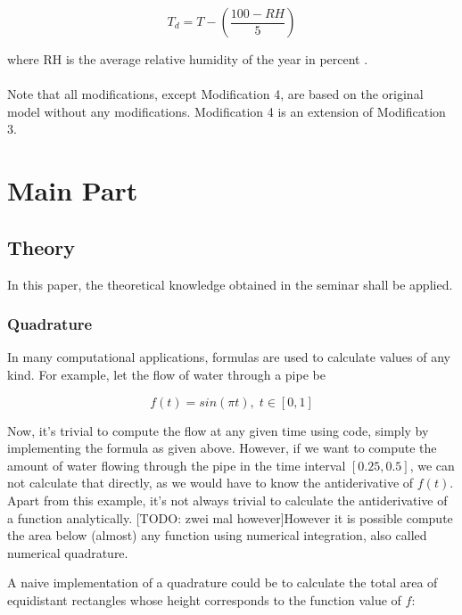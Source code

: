 \documentclass[12pt, a4paper, oneside]{article}
\begin{document}
\begin{equation}
	{T_d} = T - (\frac{100 - RH}{5})
\end{equation}

where RH is the average relative humidity of the year in percent \citep{lawrence2005relationship}.\\\\


Note that all modifications, except Modification 4, are based on the original model without any modifications.
Modification 4 is an extension of Modification 3. 

	
	\section{Main Part}
	\subsection{Theory}
	
	In this paper, the theoretical knowledge obtained in the seminar shall be applied. 
	
	\subsubsection{Quadrature}
	In many computational applications, formulas 	are used to calculate values of any kind. For example, let the flow of water through a pipe be 

	\begin{equation}
	f(t) = sin(\pi t), \; t \in [0,1]
	\end{equation}

Now, it's trivial to compute the flow at any given time using code, simply by implementing the formula as given above. 
However, if we want to compute the amount of water flowing through the pipe in the time interval $[0.25, 0.5]$, we can not calculate that directly, as we would have to know the antiderivative of $f(t)$. 
Apart from this example, it's not always trivial to calculate the antiderivative of a function analytically. 
[TODO: zwei mal however]However it is possible compute the area below (almost) any function using numerical integration, also called numerical quadrature. 

A naive implementation of a quadrature could be to calculate the total area of equidistant rectangles whose height corresponds to the function value of $f$: 
\end{document}
